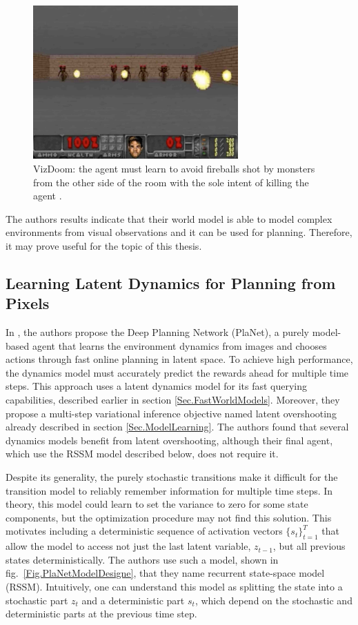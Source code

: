\begin{figure}[H]
\includegraphics[width=0.7\textwidth,keepaspectratio]{figures/VizDoom.png}
\caption[VizDoom]{VizDoom: the agent must learn to avoid fireballs shot by monsters from the other side of the room with the sole intent of killing the agent \protect\cite{Algo.WorldModels}.}
\label{Fig.VizDoom}
\end{figure}

The authors results indicate that their world model is able to model complex environments from visual observations and it can be used for planning. Therefore, it may prove useful for the topic of this thesis.

\subsection{Learning Latent Dynamics for Planning from Pixels}

In \cite{Algo.PlaNet}, the authors propose the Deep Planning Network (PlaNet), a purely model-based agent that learns the environment dynamics from images and chooses actions through fast online planning in latent space. To achieve high performance, the dynamics model must accurately predict the rewards ahead for multiple time steps. This approach uses a latent dynamics model for its fast querying capabilities, described earlier in section \ref{Sec.FastWorldModels}. Moreover, they propose a multi-step variational inference objective named latent overshooting already described in section \ref{Sec.ModelLearning}. The authors found that several dynamics models benefit from latent overshooting, although their final agent, which use the RSSM model described below, does not require it.

Despite its generality, the purely stochastic transitions make it difficult for the transition model to reliably remember information for multiple time steps. In theory, this model could learn to set the variance to zero for some state components, but the optimization procedure may not find this solution. This motivates including a deterministic sequence of activation vectors $\{s_t\}^T_{t=1}$ that allow the model to access not just the last latent variable, $z_{t-1}$, but all previous states deterministically. The authors use such a model, shown in fig.~\ref{Fig.PlaNetModelDesigne}, that they name recurrent state-space model (RSSM). Intuitively, one can understand this model as splitting the state into a stochastic part $z_t$ and a deterministic part $s_t$, which depend on the stochastic and deterministic parts at the previous time step.

